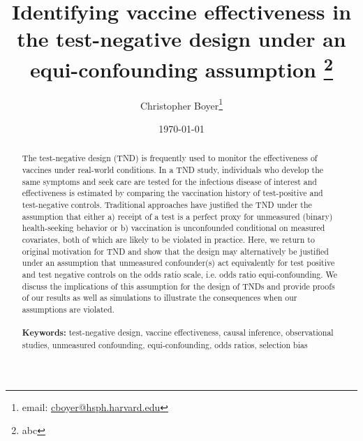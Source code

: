 \documentclass[11pt]{article}
\begin{document}
\begin{titlepage}
\title{Identifying vaccine effectiveness in the test-negative design under an equi-confounding assumption \thanks{abc}}
\author[1]{Christopher Boyer\thanks{email: \href{mailto:cboyer@hsph.harvard.edu}{cboyer@hsph.harvard.edu}}}
\date{\today}
\maketitle

\begin{abstract}
    The test-negative design (TND) is frequently used to monitor the effectiveness of vaccines under real-world conditions. In a TND study, individuals who develop the same symptoms and seek care are tested for the infectious disease of interest and effectiveness is estimated by comparing the vaccination history of test-positive and test-negative controls. Traditional approaches have justified the TND under the assumption that either a) receipt of a test is a perfect proxy for unmeasured (binary) health-seeking behavior or b) vaccination is unconfounded conditional on measured covariates, both of which are likely to be violated in practice. Here, we return to original motivation for TND and show that the design may alternatively be justified under an assumption that unmeasured confounder(s) act equivalently for test positive and test negative controls on the odds ratio scale, i.e. odds ratio equi-confounding. We discuss the implications of this assumption for the design of TNDs and provide proofs of our results as well as simulations to illustrate the consequences when our assumptions are violated.
\noindent \\
\vspace{0in} \\
\noindent\textbf{Keywords:} test-negative design, vaccine effectiveness, causal inference, observational studies, unmeasured confounding, equi-confounding, odds ratios, selection bias
\bigskip
\end{abstract}
\setcounter{page}{0}
\thispagestyle{empty}
\end{titlepage}
\pagebreak \newpage

\doublespacing
\end{document}
